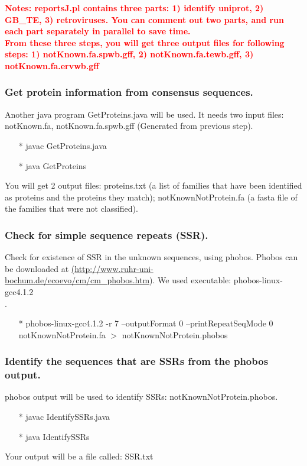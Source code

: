 \documentclass[12pt]{report}
\begin{document}
\noindent\textbf{\textcolor{red}{Notes: reportsJ.pl contains three parts: 1) identify uniprot, 2) GB\_TE, 3) retroviruses. You can comment out two parts, and run each part separately in parallel to save time. \\
		From these three steps, you will get three output files for following steps: 1) notKnown.fa.spwb.gff, 2) notKnown.fa.tewb.gff, 3) notKnown.fa.ervwb.gff}} 

\subsubsection{Get protein information from consensus sequences.}
Another java program GetProteins.java will be used. It needs two input files: notKnown.fa, notKnown.fa.spwb.gff (Generated from previous step).
\begin{enumerate}
	\item[*] javac GetProteins.java
	\item[*] java GetProteins
\end{enumerate}
You will get 2 output files: proteins.txt (a list of families that have been identified as proteins and the proteins they match);
notKnownNotProtein.fa (a fasta file of the families that were not classified).

\subsubsection{Check for simple sequence repeats (SSR).}
Check for existence of SSR in the unknown sequences, using phobos. Phobos can be downloaded at \href{<url>}(\url{http://www.ruhr-uni-bochum.de/ecoevo/cm/cm_phobos.htm}). We used executable: phobos-linux-gcc4.1.2\\
.
\begin{enumerate}
	\item[*] phobos-linux-gcc4.1.2 -r 7 --outputFormat 0 --printRepeatSeqMode 0 notKnownNotProtein.fa $>$ notKnownNotProtein.phobos
\end{enumerate}

\subsubsection{Identify the sequences that are SSRs from the phobos output.}
phobos output will be used to identify SSRs: notKnownNotProtein.phobos.
\begin{enumerate}
	\item[*] javac IdentifySSRs.java
	\item[*] java IdentifySSRs
\end{enumerate}
Your output will be a file called: SSR.txt
\end{document}
